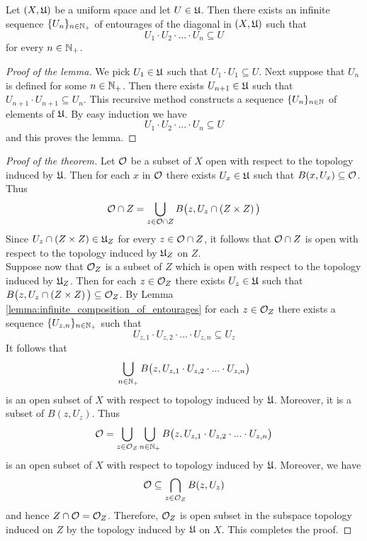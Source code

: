 \begin{lemma}\label{lemma:infinite_composition_of_entourages}
Let $(X,{\mathfrak U})$ be a uniform space and let $U \in {\mathfrak U}$. Then there exists an infinite sequence $\{U_n\}_{n\in {\mathbb N}_+}$ of entourages of the diagonal in $(X,{\mathfrak U})$ such that 
$$U_1\cdot U_2\cdot ...\cdot U_n \subseteq U$$
for every $n\in {\mathbb N}_+$. 
\end{lemma}
\begin{proof}[Proof of the lemma]
We pick $U_1 \in {\mathfrak U}$ such that $U_1\cdot U_1 \subseteq U$. Next suppose that $U_n$ is defined for some $n\in {\mathbb N}_+$. Then there exists $U_{n+1}\in {\mathfrak U}$ such that $U_{n+1}\cdot U_{n+1}\subseteq U_n$. This recursive method constructs a sequence $\{U_n\}_{n\in {\mathbb N}}$ of elements of ${\mathfrak U}$. By easy induction we have
$$U_1\cdot U_2\cdot ...\cdot U_n \subseteq U$$
and this proves the lemma.
\end{proof}

\begin{proof}[Proof of the theorem]
Let ${\mathcal O}$ be a subset of $X$ open with respect to the topology induced by ${\mathfrak U}$. Then for each $x$ in ${\mathcal O}$ there exists $U_x\in {\mathfrak U}$ such that $B(x,U_x)\subseteq {\mathcal O}$. Thus
$${\mathcal O} \cap Z = \bigcup_{z\in {\mathcal O}\cap Z}B\big(z,U_z\cap \left(Z\times Z\right)\big)$$
Since $U_z\cap \left(Z\times Z\right) \in {\mathfrak U}_Z$ for every $z \in {\mathcal O}\cap Z$, it follows that ${\mathcal O}\cap Z$ is open with respect to the topology induced by ${\mathfrak U}_Z$ on $Z$.\\
Suppose now that ${\mathcal O}_Z$ is a subset of $Z$ which is open with respect to the topology induced by ${\mathfrak U}_Z$. Then for each $z\in {\mathcal O}_Z$ there exists $U_z \in {\mathfrak U}$ such that $B\big(z,U_z\cap \left(Z\times Z\right)\big)\subseteq {\mathcal O}_Z$. By Lemma \ref{lemma:infinite_composition_of_entourages} for each $z\in {\mathcal O}_Z$ there exists a sequence $\{U_{z,n}\}_{n\in {\mathbb N}_+}$ such that 
$$U_{z,1}\cdot U_{z,2}\cdot ...\cdot U_{z,n}\subseteq U_z$$
It follows that
$$\bigcup_{n\in {\mathbb N}_+}B\big(z, U_{z,1}\cdot U_{z,2}\cdot ...\cdot U_{z,n}\big)$$
is an open subset of $X$ with respect to topology induced by ${\mathfrak U}$. Moreover, it is a subset of $B(z,U_z)$.
Thus 
$${\mathcal O} = \bigcup_{z \in {\mathcal O}_Z}\bigcup_{n\in {\mathbb N}_+}B\big(z, U_{z,1}\cdot U_{z,2}\cdot ...\cdot U_{z,n}\big)$$
is an open subset of $X$ with respect to topology induced by ${\mathfrak U}$. Moreover, we have
$${\mathcal O} \subseteq \bigcap_{z\in {\mathcal O}_Z}B(z,U_z)$$
and hence $Z\cap {\mathcal O} = {\mathcal O}_Z$. Therefore, ${\mathcal O}_Z$ is open subset in the subspace topology induced on $Z$ by the topology induced by ${\mathfrak U}$ on $X$. This completes the proof.
\end{proof}


